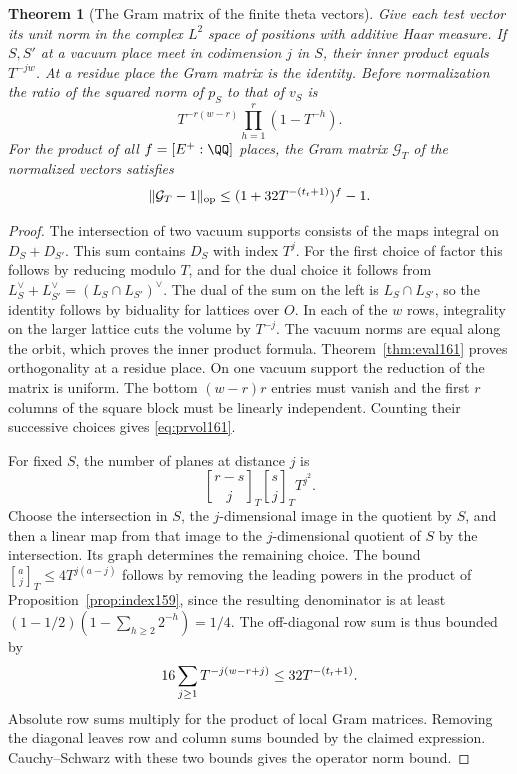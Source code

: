 \documentclass[a4paper,11pt]{article}
\newtheorem{theorem}[proposition]{Theorem}
\theoremstyle{definition}
\theoremstyle{remark}
\numberwithin{equation}{section}
\begin{document}
\begin{theorem}[The Gram matrix of the finite theta vectors]
\label{thm:gram161}
Give each test vector its unit norm in the complex \(L^2\)
space of positions with additive Haar measure. If \(S,S'\) at a
vacuum place meet in codimension \(j\) in \(S\), their inner
product equals \(T^{-jw}\). At a residue place the Gram matrix
is the identity. Before normalization the ratio of the squared
norm of \(p_S\) to that of \(v_S\) is
\begin{equation}
      T^{-r(w-r)}\prod_{h=1}^{r}(1-T^{-h}).
      \label{eq:prvol161}
\end{equation}
For the product of all \(f=[E^+:\QQ]\) places, the Gram matrix
\(\mathcal G_T\) of the normalized vectors satisfies
\[
    \|\mathcal G_T-1\|_{\rm op}
      \le (1+32T^{-(t_{\rm r}+1)})^{f}-1.
\]
\end{theorem}
\begin{proof}
The intersection of two vacuum supports consists of the maps
integral on \(D_S+D_{S'}\). This sum contains \(D_S\) with
index \(T^j\). For the first choice of factor this follows by
reducing modulo \(T\), and for the dual choice it follows from
\(L_S^\vee+L_{S'}^\vee=(L_S\cap L_{S'})^\vee\). The dual of
the sum on the left is \(L_S\cap L_{S'}\), so the identity
follows by biduality for lattices over \(O\). In each of the
\(w\) rows, integrality on the larger lattice cuts the volume
by \(T^{-j}\). The vacuum norms are equal along the orbit,
which proves the inner product formula. Theorem~\ref{thm:eval161}
proves orthogonality at a residue place. On one vacuum support
the reduction of the matrix is uniform. The bottom
\((w-r)r\) entries must vanish and the first \(r\) columns of
the square block must be linearly independent. Counting their
successive choices gives \eqref{eq:prvol161}.

For fixed \(S\), the number of planes at distance \(j\) is
\[
       {r-s\brack j}_T{s\brack j}_T T^{j^2}.
\]
Choose the intersection in \(S\), the \(j\)-dimensional image
in the quotient by \(S\), and then a linear map from that image
to the \(j\)-dimensional quotient of \(S\) by the intersection.
Its graph determines the remaining choice. The bound
\({a\brack j}_T\le4T^{j(a-j)}\) follows by removing the leading
powers in the product of Proposition~\ref{prop:index159}, since
the resulting denominator is at least
\((1-1/2)(1-\sum_{h\ge2}2^{-h})=1/4\).
The off-diagonal row sum is thus bounded by
\[
     16\sum_{j\ge1}T^{-j(w-r+j)}\le32T^{-(t_{\rm r}+1)}.
\]
Absolute row sums multiply for the product of local Gram
matrices. Removing the diagonal leaves row and column sums
bounded by the claimed expression. Cauchy--Schwarz with these
two bounds gives the operator norm bound.
\end{proof}
\end{document}
